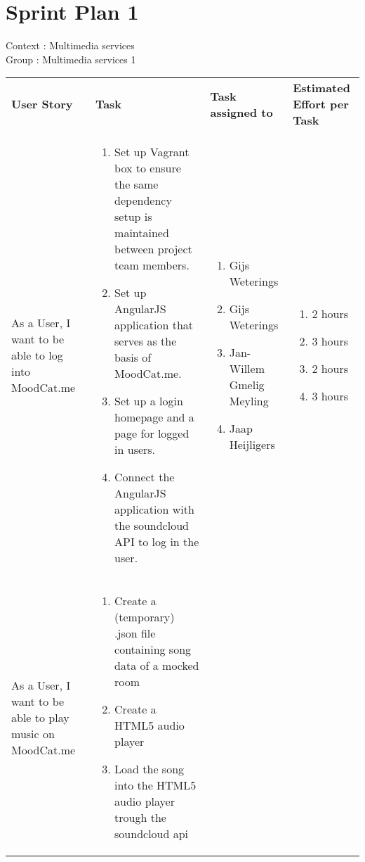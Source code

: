 \documentclass[11pt,a4paper]{article}
\begin{document}
\section*{Sprint Plan 1}
Context : Multimedia services\\
Group : Multimedia services 1\\



\begin{table}[h]
\begin{tabular}{|p{4.5cm}|p{7cm}|p{4cm}|p{2cm}|}
\textbf{User Story} & \textbf{Task} & \textbf{Task assigned to} & \textbf{Estimated Effort per Task} \\
As a User, I want to be able to log into MoodCat.me & \begin{enumerate}
\item Set up Vagrant box to ensure the same dependency setup is maintained between project team members.
\item Set up AngularJS application that serves as the basis of MoodCat.me.
\item Set up a login homepage and a page for logged in users.
\item Connect the AngularJS application with the soundcloud API to log in the user.
\end{enumerate}

& 
\begin{enumerate}
\item Gijs Weterings
\item Gijs Weterings
\item Jan-Willem Gmelig Meyling
\item Jaap Heijligers 
\end{enumerate}

& 
\begin{enumerate}
\item 2 hours
\item 3 hours
\item 2 hours
\item 3 hours
\end{enumerate} \\

As a User, I want to be able to play music on MoodCat.me & \begin{enumerate}
\item Create a (temporary) .json file containing song data of a mocked room
\item Create a HTML5 audio player 
\item Load the song into the HTML5 audio player trough the soundcloud api
\end{enumerate}


\end{tabular}
\end{table}
\end{document}
